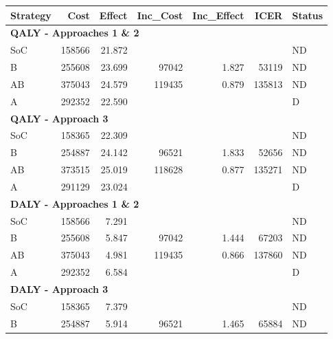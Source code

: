 \documentclass[
]{agujournal2019}
\begin{document}
\begin{table}
\centering
\begin{tabular}{l|r|r|r|r|r|l}
\hline
Strategy & Cost & Effect & Inc\_Cost & Inc\_Effect & ICER & Status\\
\hline
\multicolumn{7}{l}{\textbf{QALY - Approaches 1 \& 2}}\\
\hline
\hspace{1em}SoC & 158566 & 21.872 &  &  &  & \vphantom{1} ND\\
\hline
\hspace{1em}B & 255608 & 23.699 & 97042 & 1.827 & 53119 & \vphantom{1} ND\\
\hline
\hspace{1em}AB & 375043 & 24.579 & 119435 & 0.879 & 135813 & \vphantom{1} ND\\
\hline
\hspace{1em}A & 292352 & 22.590 &  &  &  & \vphantom{1} D\\
\hline
\multicolumn{7}{l}{\textbf{QALY - Approach 3}}\\
\hline
\hspace{1em}SoC & 158365 & 22.309 &  &  &  & ND\\
\hline
\hspace{1em}B & 254887 & 24.142 & 96521 & 1.833 & 52656 & ND\\
\hline
\hspace{1em}AB & 373515 & 25.019 & 118628 & 0.877 & 135271 & ND\\
\hline
\hspace{1em}A & 291129 & 23.024 &  &  &  & D\\
\hline
\multicolumn{7}{l}{\textbf{DALY - Approaches 1 \& 2}}\\
\hline
\hspace{1em}SoC & 158566 & 7.291 &  &  &  & ND\\
\hline
\hspace{1em}B & 255608 & 5.847 & 97042 & 1.444 & 67203 & ND\\
\hline
\hspace{1em}AB & 375043 & 4.981 & 119435 & 0.866 & 137860 & ND\\
\hline
\hspace{1em}A & 292352 & 6.584 &  &  &  & D\\
\hline
\multicolumn{7}{l}{\textbf{DALY - Approach 3}}\\
\hline
\hspace{1em}SoC & 158365 & 7.379 &  &  &  & ND\\
\hline
\hspace{1em}B & 254887 & 5.914 & 96521 & 1.465 & 65884 & ND\\

\end{tabular}
\end{table}
\end{document}
